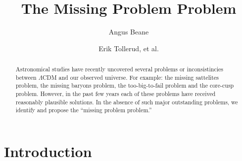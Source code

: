 \documentclass{aastex62}
\begin{document}
\title{The Missing Problem Problem}


\author{Angus Beane}

\author{Erik Tollerud, et al.}

\begin{abstract}

Astronomical studies have recently uncovered several problems or
inconsistincies between $\Lambda$CDM and our observed universe. For example:
the missing sattelites problem, the missing baryons problem, the
too-big-to-fail problem and the core-cusp problem. However, in the past few
years each of these problems have received reasonably plausible solutions. In
the absence of such major outstanding problems, we identify and propose the
``missing problem problem.''

\end{abstract}


\section{Introduction} \label{sec:intro}
\end{document}
